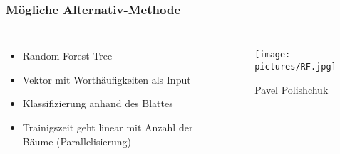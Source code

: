 \documentclass[aspectratio=1610, professionalfonts, 9pt]{beamer}
\begin{document}
  \begin{frame}
    \frametitle{Mögliche Alternativ-Methode}
    \begin{columns}
    \begin{itemize}
      \item Random Forest Tree
      \item Vektor mit Worthäufigkeiten als Input
      \item Klassifizierung anhand des Blattes
      \item Trainigszeit geht linear mit Anzahl der Bäume (Parallelisierung)
    \end{itemize}

    \begin{figure}
          \texttt{[image: pictures/RF.jpg]}
          \caption{Pavel Polishchuk}
          \label{}
      \end{figure}
    \end{columns}
    \end{frame}

  \begin{frame}
    \printbibliography
  \end{frame}
\end{document}
